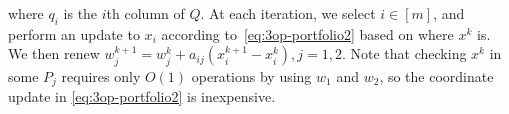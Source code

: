 where $q_i$ is the $i$th column of $Q$. At each iteration, we select $i \in [m]$, and perform an update to $x_i$ according to~\eqref{eq:3op-portfolio2} based on where $x^k$ is. We then renew $w_j^{k+1}=w_j^k+a_{ij}(x_i^{k+1}-x_i^k), j=1,2$. Note that checking $x^k$ in some $P_j$ requires only $O(1)$ operations by using $w_1$ and $w_2$, so the coordinate update in \eqref{eq:3op-portfolio2} is inexpensive.
